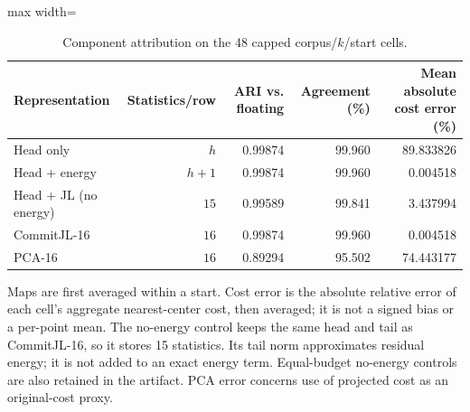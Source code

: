 \begin{table}[tp]
\caption{Component attribution on the 48 capped corpus/$k$/start cells.}\label{tab:ablation}
\centering\small
\begin{adjustbox}{max width=\textwidth}
\begin{tabular}{@{}lrrrr@{}}
\toprule
Representation & Statistics/row & ARI vs. floating & Agreement (\%) & Mean absolute cost error (\%) \\
\midrule
Head only & $h$ & 0.99874 & 99.960 & 89.833826 \\
Head + energy & $h+1$ & 0.99874 & 99.960 & 0.004518 \\
Head + JL (no energy) & $15$ & 0.99589 & 99.841 & 3.437994 \\
CommitJL-16 & $16$ & 0.99874 & 99.960 & 0.004518 \\
PCA-16 & $16$ & 0.89294 & 95.502 & 74.443177 \\
\bottomrule
\end{tabular}
\end{adjustbox}
\par\vspace{3pt}\begin{minipage}{0.98\textwidth}\footnotesize Maps are first averaged within a start. Cost error is the absolute relative error of each cell's aggregate nearest-center cost, then averaged; it is not a signed bias or a per-point mean. The no-energy control keeps the same head and tail as CommitJL-16, so it stores 15 statistics. Its tail norm approximates residual energy; it is not added to an exact energy term. Equal-budget no-energy controls are also retained in the artifact. PCA error concerns use of projected cost as an original-cost proxy.\end{minipage}
\end{table}
